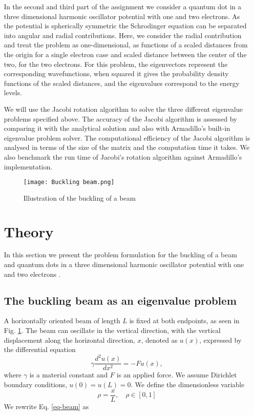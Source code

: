 \documentclass[a4paper]{article}
\begin{document}
In the second and third part of the assignment we consider a quantum dot in a three dimensional harmonic oscillator potential with one and two electrons. As the potential is spherically symmetric the Schrodinger equation can be separated into angular and radial contributions. Here, we consider the radial contribution and treat the problem as one-dimensional, as functions of a scaled distances from the origin for a single electron case and scaled distance between the center of the two, for the two electrons. For this problem, the eigenvectors represent the corresponding wavefunctions, when squared it gives the probability density functions of the scaled distances, and the eigenvalues correspond to the energy levels.

We will use the Jacobi rotation algorithm to solve the three different eigenvalue problems specified above. The accuracy of the Jacobi algorithm is assessed by comparing it with the analytical solution and also with Armadillo's built-in eigenvalue problem solver. The computational efficiency of the Jacobi algorithm is analysed in terms of the size of the matrix and the computation time it takes. We also benchmark the run time of Jacobi's rotation algorithm against Armadillo's implementation.

\begin{figure}[H]
  \centering
  \texttt{[image: Buckling beam.png]}
  \caption{Illustration of the buckling of a beam}
   \label{fig: buckling beam}
\end{figure}


\section{Theory}
In this section we present the problem formulation for the buckling of a beam and quantum dots in a three dimensional harmonic oscillator potential with one and two electrons \cite{hjorten}.

\subsection{The buckling beam as an eigenvalue problem}\label{sec-bm}
\label{section:beam}
A horizontally oriented beam of length $L$ is fixed at both endpoints, as seen in Fig. \ref{fig: buckling beam}. The beam can oscillate in the vertical direction, with the vertical displacement along the horizontal direction, $x$, denoted as $u(x)$, expressed by the differential equation
\begin{equation}\label{eq-beam}
\gamma \frac{d^2 u(x)}{dx^2} = -Fu(x),
\end{equation}
where $\gamma$ is a material constant and $F$ is an applied force. We assume Dirichlet boundary conditions, $u(0) = u(L) = 0$. We define the dimensionless variable
\begin{equation}
\rho = \frac{x}{L},\quad \rho \in [0,1]
\end{equation}
We rewrite Eq. \eqref{eq-beam} as
\end{document}
